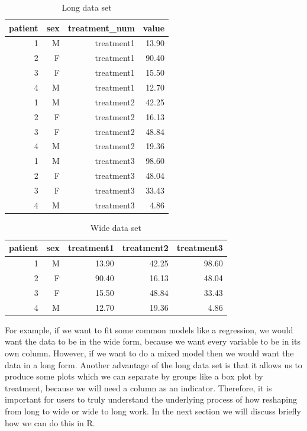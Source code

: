 \begin{table}[H]
\centering
\begin{tabular}{rrrr}
  \hline
patient & sex & treatment\_num & value \\ 
  \hline
1 & M & treatment1 & 13.90 \\ 
2 & F & treatment1 & 90.40 \\ 
3 & F & treatment1 & 15.50 \\ 
4 & M & treatment1 & 12.70 \\ 
1 & M & treatment2 & 42.25 \\ 
2 & F & treatment2 & 16.13 \\ 
3 & F & treatment2 & 48.84 \\ 
4 & M & treatment2 & 19.36 \\ 
1 & M & treatment3 & 98.60 \\ 
2 & F & treatment3 & 48.04 \\ 
3 & F & treatment3 & 33.43 \\ 
4 & M & treatment3 & 4.86 \\ 
   \hline
\end{tabular}
\caption{Long data set}
\label{t:longd}
\end{table}

\begin{table}[H]
\centering
\begin{tabular}{rrrrr}
  \hline
patient & sex & treatment1 & treatment2 & treatment3 \\ 
  \hline
1 & M & 13.90 & 42.25 & 98.60 \\ 
2 & F & 90.40 & 16.13 & 48.04 \\ 
3 & F & 15.50 & 48.84 & 33.43 \\ 
4 & M & 12.70 & 19.36 & 4.86 \\ 
   \hline
\end{tabular}
\caption{Wide data set}
\label{t:wided}
\end{table}

For example, if we want to fit some common models like a regression, we would want the data to be in the wide form, because we want every variable to be in its own column. However, if we want to do a mixed model then we would want the data in a long form. Another advantage of the long data set is that it allows us to produce some plots which we can separate by groups like a box plot by treatment, because we will need a column as an indicator. Therefore, it is important for users to truly understand the underlying process of how reshaping from long to wide or wide to long work. In the next section we will discuss briefly how we can do this in \textsf{R}.

